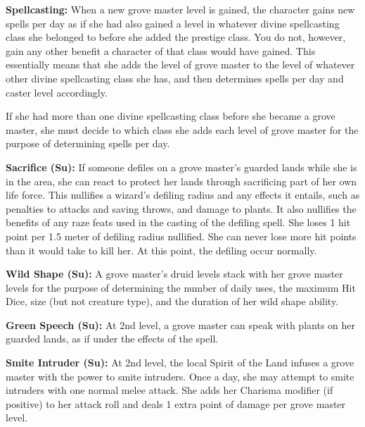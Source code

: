 {
\textbf{Spellcasting:} When a new grove master level is gained, the character gains new spells per day as if she had also gained a level in whatever divine spellcasting class she belonged to before she added the prestige class. You do not, however, gain any other benefit a character of that class would have gained. This essentially means that she adds the level of grove master to the level of whatever other divine spellcasting class she has, and then determines spells per day and caster level accordingly.

If she had more than one divine spellcasting class before she became a grove master, she must decide to which class she adds each level of grove master for the purpose of determining spells per day.


\textbf{Sacrifice (Su):} If someone defiles on a grove master's guarded lands while she is in the area, she can react to protect her lands through sacrificing part of her own life force. This nullifies a wizard's defiling radius and any effects it entails, such as penalties to attacks and saving throws, and damage to plants. It also nullifies the benefits of any raze feats used in the casting of the defiling spell. She loses 1 hit point per 1.5 meter of defiling radius nullified. She can never lose more hit points than it would take to kill her. At this point, the defiling occur normally.

\textbf{Wild Shape (Su):} A grove master's druid levels stack with her grove master levels for the purpose of determining the number of daily uses, the maximum Hit Dice, size (but not creature type), and the duration of her wild shape ability.

\textbf{Green Speech (Su):} At 2nd level, a grove master can speak with plants on her guarded lands, as if under the effects of the  spell.

\textbf{Smite Intruder (Su):} At 2nd level, the local Spirit of the Land infuses a grove master with the power to smite intruders. Once a day, she may attempt to smite intruders with one normal melee attack. She adds her Charisma modifier (if positive) to her attack roll and deals 1 extra point of damage per grove master level.

}
